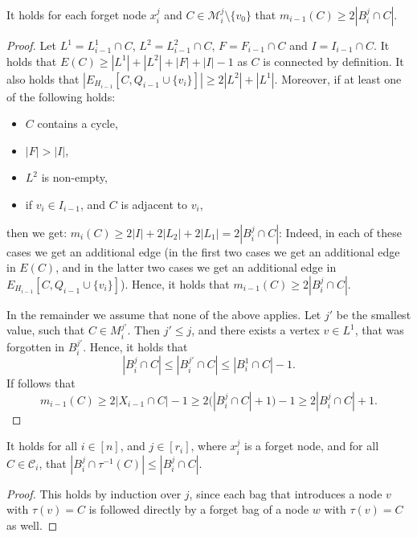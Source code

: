 \documentclass[a4paper,UKenglish,cleveref, autoref, thm-restate]{lipics-v2021}
\begin{document}
\begin{lemma}\label{lem:bound-vertices-adjacent-to-vi}
    It holds for each forget node $x_i^j$ and $C \in \mathcal{M}_i^j\setminus\{v_0\}$ that $m_{i-1}(C) \geq 2 |B_i^{j} \cap C|$.
\end{lemma}

\begin{proof}
    Let $L^1 = L^1_{i-1}\cap C$, $L^2 = L^2_{i-1} \cap C$, $F = F_{i-1} \cap C$ and $I = I_{i-1} \cap C$. It holds that $E(C) \geq |L^1| + |L^2| + |F| + |I| - 1$ as $C$ is connected by definition. 
    It also holds that 
    $|E_{H_{i-1}}[C, Q_{i-1}\cup \{v_i\}]| \geq 2|L^2| + |L^1|$.
    Moreover, if at least one of the following holds:
    \begin{itemize}
     	 \item $C$ contains a cycle, 
     	 \item $|F| > |I|$, 
    	 \item $L^2$ is non-empty, 
    	 \item if $v_i \in I_{i-1}$, and $C$ is adjacent to $v_i$, 
     \end{itemize}
     then we get: $m_i(C) \geq 2|I| + 2|L_2| + 2|L_1| = 2|B_i^j \cap C|$: Indeed, in each of these cases we get an additional edge (in the first two cases we get an additional edge in $E(C)$, and in the latter two cases we get an additional edge in $E_{H_{i-1}}[C, Q_{i-1}\cup \{v_i\}]$). Hence, it holds that $m_{i-1}(C) \geq 2|B_i^j \cap C|$.
     
    In the remainder we assume that none of the above applies.
    Let $j'$ be the smallest value, such that $C \in M_i^{j'}$. Then $j'\leq j$, and there exists a vertex $v \in L^1$, that was forgotten in $B_i^{j'}$. Hence, it holds that
    \[
    |B_i^j\cap C|\leq |B_i^{j'}\cap C|\leq |B_i^1\cap C| - 1.
    \]
    If follows that
    \[
    m_{i-1}(C) \geq 2|X_{i-1}\cap C| - 1 \geq 2\big(|B_i^j\cap C| + 1\big) - 1 \geq 2 |B_i^j \cap C| + 1.
    \]
\end{proof}

\begin{lemma}\label{lem:transition-component-size}
It holds for all $i\in[n]$, and $j\in [r_i]$, where $x_i^j$ is a forget node, and for all $C\in \mathcal{C}_i$, that $|B_i^j\cap \tau^{-1}(C)|\leq |B_i^j\cap C|$.
\end{lemma}

\begin{proof}
    This holds by induction over $j$, since each bag that introduces a node $v$ with $\tau(v) = C$ is followed directly by a forget bag of a node $w$ with $\tau(v) = C$ as well.
\end{proof}
\end{document}
